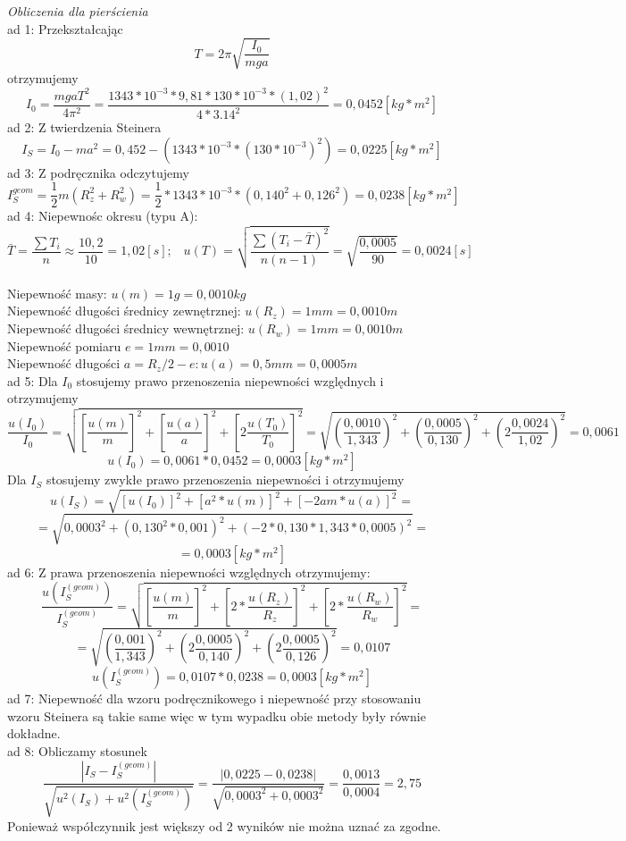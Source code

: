 \documentclass[a4paper,10pt,twoside]{article}
\begin{document}
\textit{Obliczenia dla pierścienia}\\
\noindent
ad 1: Przekształcając 
$$
T = 2\pi\sqrt{\frac{I_0}{mga}}
$$
otrzymujemy
$$
I_0 = \frac{mgaT^2}{4\pi^2} = \frac{1343 * 10^{-3} * 9,81 * 130 * 10^{-3} * (1,02)^2}{4*3.14^2} = 0,0452[kg*m^2]
$$
ad 2: Z twierdzenia Steinera 
$$
I_S = I_0 - ma^2 = 0,452 - (1343*10^{-3}*(130*10^{-3})^2) = 0,0225[kg*m^2]
$$
ad 3: Z podręcznika odczytujemy $$I_S^{geom} = \frac{1}{2}m(R_z^2+ R_w^2) = \frac{1}{2}*1343*10^{-3}*(0,140^2 + 0,126^2) = 0,0238[kg*m^2]
$$
ad 4: Niepewnośc okresu (typu A): $$\bar{T} = \frac{\sum T_i}{n} \approx \frac{10,2}{10} = 1,02[s] ;\hspace{10pt} u(T) = \sqrt{\frac{\sum (T_i - \bar{T})^2}{n(n-1)}} = \sqrt{\frac{0,0005}{90}} = 0,0024[s] 
$$
\\ Niepewność masy: $u(m) = 1 g = 0,0010 kg$ 
\\ Niepewność długości średnicy zewnętrznej: $u(R_z) = 1 mm = 0,0010 m$
\\ Niepewność długości średnicy wewnętrznej:
 $u(R_w) = 1 mm = 0,0010 m$
\\Niepewność pomiaru $e = 1mm = 0,0010$
\\ Niepewność długości $a = R_z/2 - e: u(a) = 0,5mm = 0,0005 m$
\\ad 5: Dla $I_0$ stosujemy prawo przenoszenia niepewności względnych i otrzymujemy 
$$
\frac{u(I_0)}{I_0} = \sqrt{\left[\frac{u(m)}{m}\right]^2 + \left[\frac{u(a)}{a}\right]^2 + \left[2\frac{u(T_0)}{T_0}\right]^2} = \sqrt{\left(\frac{0,0010}{1,343}\right)^2 + \left(\frac{0,0005}{0,130}\right)^2 + \left(2\frac{0,0024}{1,02}\right)^2} = 0,0061
$$
$$
u(I_0) = 0,0061 * 0,0452 = 0,0003[kg * m^2]
$$
Dla $I_S$ stosujemy zwykłe prawo przenoszenia niepewności i otrzymujemy 
$$
u(I_S) = \sqrt{[u(I_0)]^2 + [a^2 * u(m)]^2 + [-2 am * u(a)]^2} =$$ $$= \sqrt{0,0003^2 + (0,130^2 * 0,001)^2 + (-2*0,130*1,343*0,0005)^2} = $$
$$ = 0,0003[kg * m^2]
$$
ad 6: Z prawa przenoszenia niepewności względnych otrzymujemy:
$$
\frac{u(I_S^{(geom)})}{I_S^{(geom)}} = \sqrt{\left[\frac{u(m)}{m}\right]^2 + \left[2*\frac{u(R_z)}{R_z}\right]^2 + \left[2*\frac{u(R_w)}{R_w}\right]^2}=$$ $$ = \sqrt{\left(\frac{0,001}{1,343}\right)^2 + \left(2\frac{0,0005}{0,140}\right)^2 + \left(2\frac{0,0005}{0,126}\right)^2} = 0,0107$$
$$
u(I_S^{(geom)}) = 0,0107 * 0,0238 = 0,0003[kg*m^2]
$$
ad 7: Niepewność dla wzoru podręcznikowego i niepewność przy stosowaniu wzoru Steinera 
są takie same więc w tym wypadku obie metody były równie dokładne.
\\ad 8: Obliczamy stosunek
$$
\frac{|I_S - I_S^{(geom)}|}{\sqrt{u^2(I_S) +  u^2(I_S^{(geom)})}} = \frac{|0,0225 - 0,0238|}{\sqrt{0,0003^2 + 0,0003^2}} = \frac{0,0013}{0,0004} = 2,75
$$
Ponieważ współczynnik jest większy od 2 wyników nie można uznać za zgodne.
\end{document}
